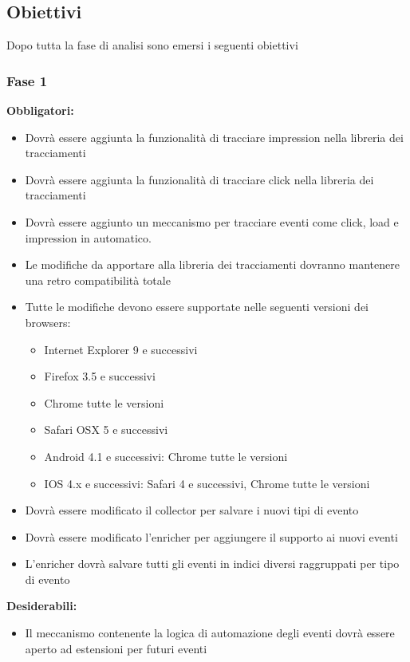 \documentclass[a4paper, 12pt, twoside, openright]{book}
\begin{document}
\subsection{Obiettivi}
Dopo tutta la fase di analisi sono emersi i seguenti obiettivi

\subsubsection{Fase 1}
\textbf{Obbligatori:}
\begin{itemize}
\item Dovrà essere aggiunta la funzionalità di tracciare impression nella libreria dei tracciamenti
\item Dovrà essere aggiunta la funzionalità di tracciare click nella libreria dei tracciamenti
\item Dovrà essere aggiunto un meccanismo per tracciare eventi come click, load e impression in automatico.
\item Le modifiche da apportare alla libreria dei tracciamenti dovranno mantenere una retro compatibilità totale
\item Tutte le modifiche devono essere supportate nelle seguenti versioni dei browsers:
	\begin{itemize}
	\item Internet Explorer 9 e successivi
	\item Firefox 3.5 e successivi
	\item Chrome tutte le versioni
	\item Safari OSX 5 e successivi
	\item Android 4.1 e successivi: Chrome tutte le versioni
	\item IOS 4.x e successivi: Safari 4 e successivi, Chrome tutte le versioni
	\end{itemize}
\item Dovrà essere modificato il collector per salvare i nuovi tipi di evento
\item Dovrà essere modificato l'enricher per aggiungere il supporto ai nuovi eventi
\item L'enricher dovrà salvare tutti gli eventi in indici diversi raggruppati per tipo di evento
\end{itemize}

\textbf{Desiderabili:}
\begin{itemize}
\item Il meccanismo contenente la logica di automazione degli eventi dovrà essere aperto ad estensioni per futuri eventi
\end{itemize}
\end{document}
